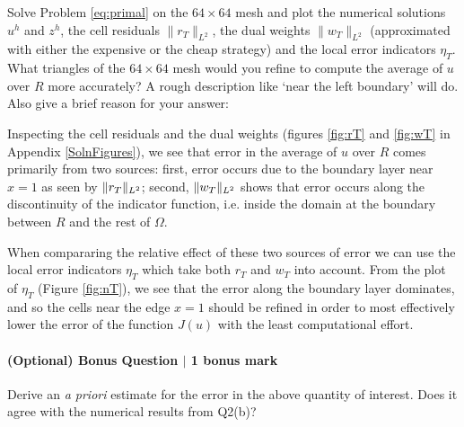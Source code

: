 \begin{enumerate}[(a)]
Solve Problem \eqref{eq:primal} on the $64 \times 64$ mesh and plot the numerical solutions $u^h$ and $z^h$, the cell residuals $\lVert r_T \rVert_{L^2}$, the dual weights $\lVert w_T \rVert_{L^2}$ (approximated with either the expensive or the cheap strategy) and the local error indicators $\eta_T$. What triangles of the $64 \times 64$ mesh would you refine to compute the average of $u$ over $R$ more accurately? A rough description like `near the left boundary' will do. Also give a brief reason for your answer:

\begin{solution}

Inspecting the cell residuals and the dual weights (figures \ref{fig:rT} and \ref{fig:wT} in Appendix \ref{SolnFigures}), we see that error in the average of $u$ over $R$ comes primarily from two sources: first, error occurs due to the boundary layer near $x=1$ as seen by $\lVert r_T \rVert_{L^2}$; second, $\lVert w_T \rVert_{L^2}$ shows that error occurs along the discontinuity of the indicator function, i.e. inside the domain at the boundary between $R$ and the rest of $\Omega$.

When compararing the relative effect of these two sources of error we can use the local error indicators $\eta_T$ which take both $r_T$ and $w_T$ into account.
From the plot of $\eta_T$ (Figure \ref{fig:nT}), we see that the error along the boundary layer dominates, and so the cells near the edge $x=1$ should be refined in order to most effectively lower the error of the function $J(u)$ with the least computational effort.

\end{solution}

\vfill
\end{enumerate}

\paragraph*{(Optional) Bonus Question $\vert$ 1 bonus mark}%

Derive an \textit{a priori} estimate for the error in the above quantity of interest. Does it agree with the numerical results from Q2(b)?

